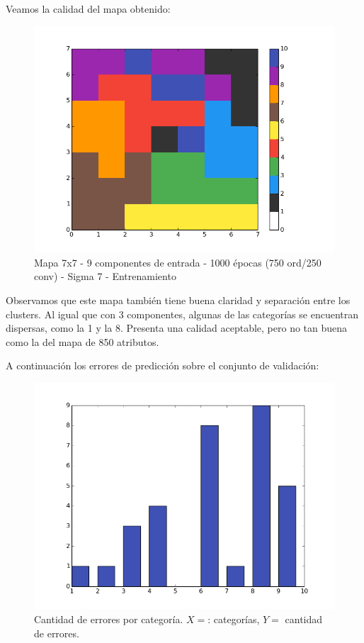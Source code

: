 Veamos la calidad del mapa obtenido:
\newpage

\begin{figure}[!htbp]
  \begin{center}
    \includegraphics[scale=0.6]{../img/map7x7_1000ep_9en_sigma7_faseord750.png}
  \caption{Mapa 7x7 - 9 componentes de entrada - 1000 épocas (750 ord/250 conv) - Sigma 7 - Entrenamiento}
  \end{center}
\end{figure}

Observamos que este mapa también tiene buena claridad y separación entre los clusters. Al igual que con 3 componentes, algunas de las categorías se encuentran dispersas, como la 1 y la 8.
Presenta una calidad aceptable, pero no tan buena como la del mapa de 850 atributos.

A continuación los errores de predicción sobre el conjunto de validación:

\begin{figure}[!htbp]
  \begin{center}
    \includegraphics[scale=0.5]{../img/validation_1000ep_9en_sigma7_faseord750.png}
  \caption{Cantidad de errores por categoría. $X=$: categorías, $Y=$ cantidad de errores.}
  \end{center}
\end{figure}

